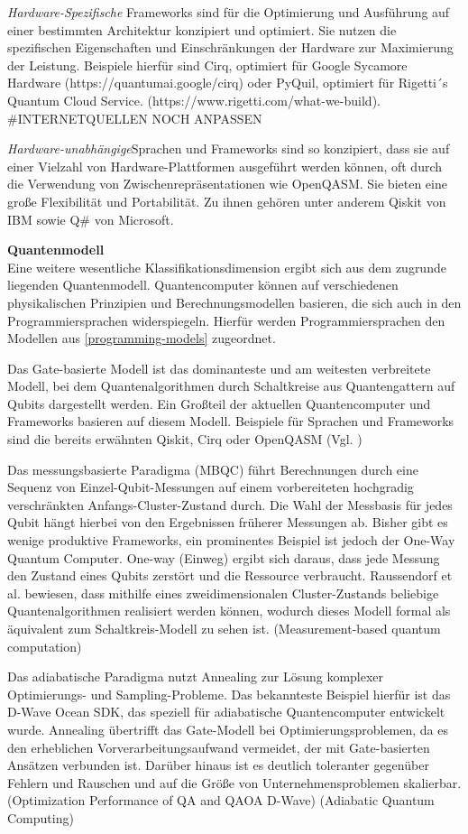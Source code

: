 \textit{Hardware-Spezifische} Frameworks sind für die Optimierung und Ausführung auf einer bestimmten Architektur konzipiert und optimiert. Sie nutzen die spezifischen Eigenschaften und Einschränkungen der Hardware zur Maximierung der Leistung. Beispiele hierfür sind Cirq, optimiert für Google Sycamore Hardware (https://quantumai.google/cirq) oder PyQuil, optimiert für Rigetti´s Quantum Cloud Service. (https://www.rigetti.com/what-we-build). #INTERNETQUELLEN NOCH ANPASSEN

\textit{Hardware-unabhängige}Sprachen und Frameworks sind so konzipiert, dass sie auf einer Vielzahl von Hardware-Plattformen ausgeführt werden können, oft durch die Verwendung von Zwischenrepräsentationen wie OpenQASM. Sie bieten eine große Flexibilität und Portabilität. Zu ihnen gehören unter anderem Qiskit von IBM sowie Q\# von Microsoft.

\textbf{Quantenmodell}\\ 
Eine weitere wesentliche Klassifikationsdimension ergibt sich aus dem zugrunde liegenden Quantenmodell. Quantencomputer können auf verschiedenen physikalischen Prinzipien und Berechnungsmodellen basieren, die sich auch in den Programmiersprachen widerspiegeln. Hierfür werden Programmiersprachen den Modellen aus \ref{programming-models} zugeordnet.

Das Gate-basierte Modell ist das dominanteste und am weitesten verbreitete Modell, bei dem Quantenalgorithmen durch Schaltkreise aus Quantengattern auf Qubits dargestellt werden. Ein Großteil der aktuellen Quantencomputer und Frameworks basieren auf diesem Modell. Beispiele für Sprachen und Frameworks sind die bereits erwähnten Qiskit, Cirq oder OpenQASM (Vgl. \cite{QUELLE FEHLT})

Das messungsbasierte Paradigma (MBQC) führt Berechnungen durch eine Sequenz von Einzel-Qubit-Messungen auf einem vorbereiteten hochgradig verschränkten Anfangs-Cluster-Zustand durch. Die Wahl der Messbasis für jedes Qubit hängt hierbei von den Ergebnissen früherer Messungen ab. Bisher gibt es wenige produktive Frameworks, ein prominentes Beispiel ist jedoch der One-Way Quantum Computer. One-way (Einweg) ergibt sich daraus, dass jede Messung den Zustand eines Qubits zerstört und die Ressource verbraucht. Raussendorf et al. bewiesen, dass mithilfe eines zweidimensionalen Cluster-Zustands beliebige Quantenalgorithmen realisiert werden können, wodurch dieses Modell formal als äquivalent zum Schaltkreis-Modell zu sehen ist. (Measurement-based quantum computation)

Das adiabatische Paradigma nutzt Annealing zur Lösung komplexer Optimierungs- und Sampling-Probleme. Das bekannteste Beispiel hierfür ist das D-Wave Ocean SDK, das speziell für adiabatische Quantencomputer entwickelt wurde. Annealing übertrifft das Gate-Modell bei Optimierungsproblemen, da es den erheblichen Vorverarbeitungsaufwand vermeidet, der mit Gate-basierten Ansätzen verbunden ist. Darüber hinaus ist es deutlich toleranter gegenüber Fehlern und Rauschen und auf die Größe von Unternehmensproblemen skalierbar. (Optimization Performance of QA and QAOA D-Wave) (Adiabatic Quantum Computing)

